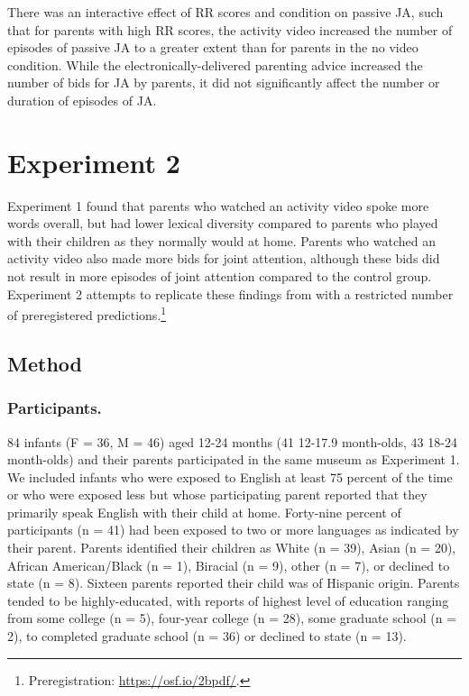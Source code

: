 \documentclass[man,floatsintext]{apa6}
\let\rmarkdownfootnote\footnote%
\def\footnote{\protect\rmarkdownfootnote}
\begin{document}
There was an interactive effect of RR scores and condition on passive JA, such that for parents with high RR scores, the activity video increased the number of episodes of passive JA to a greater extent than for parents in the no video condition.
While the electronically-delivered parenting advice increased the number of bids for JA by parents, it did not significantly affect the number or duration of episodes of JA.

\hypertarget{experiment-2}{%
\section{Experiment 2}\label{experiment-2}}

Experiment 1 found that parents who watched an activity video spoke more words overall, but had lower lexical diversity compared to parents who played with their children as they normally would at home.
Parents who watched an activity video also made more bids for joint attention, although these bids did not result in more episodes of joint attention compared to the control group.
Experiment 2 attempts to replicate these findings from with a restricted number of preregistered predictions.\footnote{Preregistration: \url{https://osf.io/2bpdf/}.}

\hypertarget{method-1}{%
\subsection{Method}\label{method-1}}

\hypertarget{participants.-1}{%
\subsubsection{Participants.}\label{participants.-1}}

84 infants (F = 36, M = 46) aged 12-24 months (41 12-17.9 month-olds, 43 18-24 month-olds) and their parents participated in the same museum as Experiment 1.
We included infants who were exposed to English at least 75 percent of the time or who were exposed less but whose participating parent reported that they primarily speak English with their child at home.
Forty-nine percent of participants (n = 41) had been exposed to two or more languages as indicated by their parent.
Parents identified their children as White (n = 39), Asian (n = 20), African American/Black (n = 1), Biracial (n = 9), other (n = 7), or declined to state (n = 8). Sixteen parents reported their child was of Hispanic origin.
Parents tended to be highly-educated, with reports of highest level of education ranging from some college (n = 5), four-year college (n = 28), some graduate school (n = 2), to completed graduate school (n = 36) or declined to state (n = 13).
\end{document}
